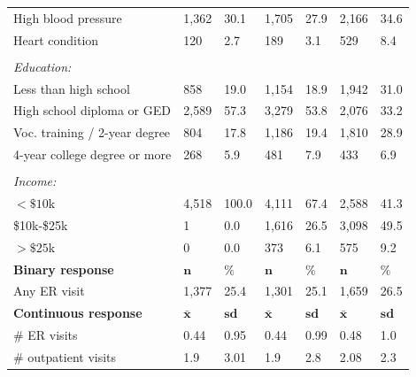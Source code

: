 \documentclass[hidelinks,12pt]{article}
\begin{document}
\begin{appendices}
\begin{singlespace}
\begin{longtable}{lllllll}
		\hspace{3mm}High blood pressure & 1,362 & 30.1 & 1,705 & 27.9 & 2,166 & 34.6  \\ 
		
		\hspace{3mm}Heart condition & 120 & 2.7 & 189 & 3.1 & 529 & 8.4 \\ 
		&  & & &  &  & \\ 
		\textit{Education:} &  & & &  &  & \\  
		\hspace{3mm}Less than high school  & 858 & 19.0 & 1,154 & 18.9 & 1,942 & 31.0  \\ 
		
		\hspace{3mm}High school diploma or GED & 2,589 & 57.3 & 3,279 & 53.8 & 2,076 & 33.2   \\ 
		
		\hspace{3mm}Voc. training / 2-year degree & 804 & 17.8 & 1,186 & 19.4 & 1,810 & 28.9  \\ 
		
		\hspace{3mm}4-year college degree or more & 268 & 5.9 & 481 & 7.9 & 433 & 6.9  \\ 
		&  & & &  &  & \\ 
		\textit{Income:} &  & & &  &  & \\ 
		\hspace{3mm} $<\$10$k & 4,518 & 100.0 & 4,111 & 67.4 & 2,588 & 41.3  \\
		
		\hspace{3mm} \$10k-\$25k & 1 & 0.0 & 1,616 & 26.5 & 3,098 & 49.5 \\
		
		\hspace{3mm} $>\$25$k & 0 & 0.0 & 373 & 6.1 & 575 & 9.2   \\
		\hline
		\hline
		\textbf{Binary response} &  $\mathbf{n}$ & $\mathbf{\%}$ & $\mathbf{n}$ & $\mathbf{\%}$ & $\mathbf{n}$ & $\mathbf{\%}$ \\ 
		\hspace{3mm}Any ER visit &  1,377 & 25.4 & 1,301 & 25.1 & 1,659 & 26.5  \\  
		\hline
		\textbf{Continuous response} &  $\mathbf{\bar{x}}$ & $\mathbf{sd}$& $\mathbf{\bar{x}}$ & $\mathbf{sd}$ & $\mathbf{\bar{x}}$ & $\mathbf{sd}$ \\  
		\hspace{3mm}$\#$ ER visits &  0.44 & 0.95 & 0.44 & 0.99 & 0.48 & 1.0  \\  
		\hspace{3mm}$\#$ outpatient visits & 1.9 & 3.01 & 1.9 & 2.8 & 2.08 & 2.3 \\
		\hline
		\hline
	\end{longtable}
\end{singlespace}
\restoregeometry


\end{appendices}
\end{document}
